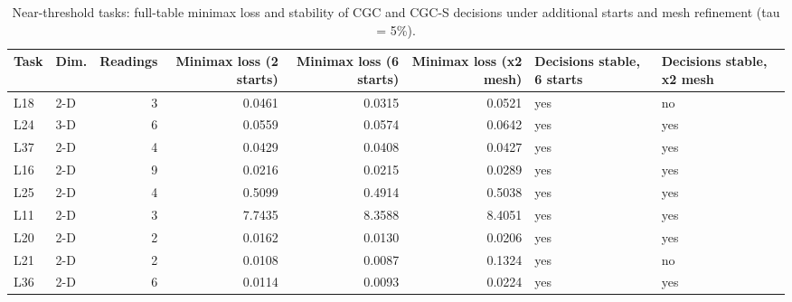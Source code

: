\begin{table}[t]
\centering\small
\caption{Near-threshold tasks: full-table minimax loss and stability of CGC and CGC-S decisions under additional starts and mesh refinement (tau = 5\%).}
\label{tab:tab_near_threshold}
\begin{tabular}{llrrrrll}
\toprule
Task & Dim. & Readings & Minimax loss (2 starts) & Minimax loss (6 starts) & Minimax loss (x2 mesh) & Decisions stable, 6 starts & Decisions stable, x2 mesh \\
\midrule
L18 & 2-D & 3 & 0.0461 & 0.0315 & 0.0521 & yes & no \\
L24 & 3-D & 6 & 0.0559 & 0.0574 & 0.0642 & yes & yes \\
L37 & 2-D & 4 & 0.0429 & 0.0408 & 0.0427 & yes & yes \\
L16 & 2-D & 9 & 0.0216 & 0.0215 & 0.0289 & yes & yes \\
L25 & 2-D & 4 & 0.5099 & 0.4914 & 0.5038 & yes & yes \\
L11 & 2-D & 3 & 7.7435 & 8.3588 & 8.4051 & yes & yes \\
L20 & 2-D & 2 & 0.0162 & 0.0130 & 0.0206 & yes & yes \\
L21 & 2-D & 2 & 0.0108 & 0.0087 & 0.1324 & yes & no \\
L36 & 2-D & 6 & 0.0114 & 0.0093 & 0.0224 & yes & yes \\
\bottomrule
\end{tabular}
\end{table}
